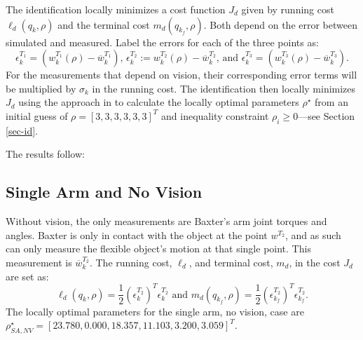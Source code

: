 \documentclass[runningheads,a4paper]{llncs}
\begin{document}
The identification locally minimizes a cost function $J_d$ given by running cost $\ell_d(q_k,\rho)$ and the terminal cost $m_d(q_{k_f},\rho)$. Both depend on the error between simulated and measured. Label the errors for each of the three points as:
\[
\epsilon^{T_1}_k = (w^{T_1}_k(\rho)-\overline{w}^{T_1}_k) \textrm{, } \epsilon^{T_2}_k := w^{T_2}_k(\rho)-\overline{w}^{T_2}_k \textrm{, and } \epsilon^{T_3}_k = (w^{T_3}_k(\rho)-\overline{w}^{T_3}_k).
\]
For the measurements that depend on vision, their corresponding error terms will be multiplied by $\sigma_k$ in the running cost. The identification then locally minimizes $J_d$ using the approach in \cite{caldwell_coleman_correll_iros} to calculate the locally optimal parameters $\rho^\star$ from an initial guess of $\rho = [3, 3, 3, 3, 3, 3]^T$ and inequality constraint $\rho_i\geq 0$---see Section \ref{sec-id}.

The results follow:

\subsection{Single Arm and No Vision \label{sec-no_vis}}
Without vision, the only measurements are Baxter's arm joint torques and angles.  Baxter is only in contact with the object at the point $w^{T_2}$, and as such can only measure the flexible object's motion at that single point. This measurement is $\overline{w}_k^{T_2}$.  %
The running cost, $\ell_d$, and terminal cost, $m_d$, in the cost $J_d$ are set as:
\[
\ell_d(q_k,\rho) = \frac{1}{2}(\epsilon^{T_2}_k)^T\epsilon^{T_2}_k \textrm{ and } m_d(q_{k_f},\rho) = \frac{1}{2}(\epsilon^{T_2}_{k_f})^T\epsilon^{T_2}_{k_f}.
\]
The locally optimal parameters for the single arm, no vision, case are $\rho_{SA,NV}^\star = [23.780,  0.000 , 18.357 , 11.103 , 3.200,  3.059]^T$.
\end{document}
